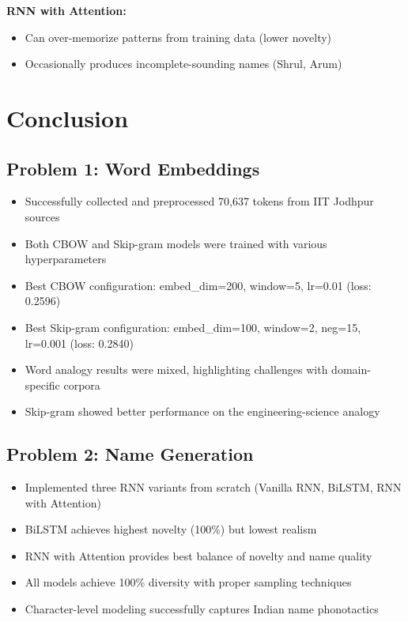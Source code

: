 \documentclass[12pt,a4paper]{article}
\begin{document}
\textbf{RNN with Attention:}
\begin{itemize}
    \item Can over-memorize patterns from training data (lower novelty)
    \item Occasionally produces incomplete-sounding names (Shrul, Arum)
\end{itemize}

\newpage
\section{Conclusion}

\subsection{Problem 1: Word Embeddings}

\begin{itemize}
    \item Successfully collected and preprocessed 70,637 tokens from IIT Jodhpur sources
    \item Both CBOW and Skip-gram models were trained with various hyperparameters
    \item Best CBOW configuration: embed\_dim=200, window=5, lr=0.01 (loss: 0.2596)
    \item Best Skip-gram configuration: embed\_dim=100, window=2, neg=15, lr=0.001 (loss: 0.2840)
    \item Word analogy results were mixed, highlighting challenges with domain-specific corpora
    \item Skip-gram showed better performance on the engineering-science analogy
\end{itemize}

\subsection{Problem 2: Name Generation}

\begin{itemize}
    \item Implemented three RNN variants from scratch (Vanilla RNN, BiLSTM, RNN with Attention)
    \item BiLSTM achieves highest novelty (100\%) but lowest realism
    \item RNN with Attention provides best balance of novelty and name quality
    \item All models achieve 100\% diversity with proper sampling techniques
    \item Character-level modeling successfully captures Indian name phonotactics
\end{itemize}
\end{document}
